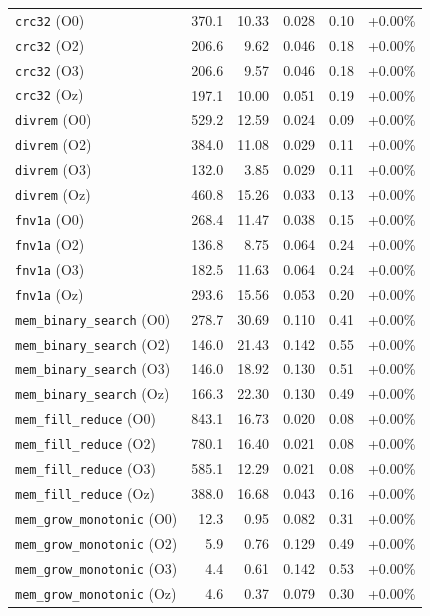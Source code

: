 {\begin{longtable}{lrrrrr}
\texttt{crc32} (O0) & 370.1 & 10.33 & 0.028 & 0.10 & +0.00\% \\
\texttt{crc32} (O2) & 206.6 & 9.62 & 0.046 & 0.18 & +0.00\% \\
\texttt{crc32} (O3) & 206.6 & 9.57 & 0.046 & 0.18 & +0.00\% \\
\texttt{crc32} (Oz) & 197.1 & 10.00 & 0.051 & 0.19 & +0.00\% \\
\texttt{divrem} (O0) & 529.2 & 12.59 & 0.024 & 0.09 & +0.00\% \\
\texttt{divrem} (O2) & 384.0 & 11.08 & 0.029 & 0.11 & +0.00\% \\
\texttt{divrem} (O3) & 132.0 & 3.85 & 0.029 & 0.11 & +0.00\% \\
\texttt{divrem} (Oz) & 460.8 & 15.26 & 0.033 & 0.13 & +0.00\% \\
\texttt{fnv1a} (O0) & 268.4 & 11.47 & 0.038 & 0.15 & +0.00\% \\
\texttt{fnv1a} (O2) & 136.8 & 8.75 & 0.064 & 0.24 & +0.00\% \\
\texttt{fnv1a} (O3) & 182.5 & 11.63 & 0.064 & 0.24 & +0.00\% \\
\texttt{fnv1a} (Oz) & 293.6 & 15.56 & 0.053 & 0.20 & +0.00\% \\
\texttt{mem\_binary\_search} (O0) & 278.7 & 30.69 & 0.110 & 0.41 & +0.00\% \\
\texttt{mem\_binary\_search} (O2) & 146.0 & 21.43 & 0.142 & 0.55 & +0.00\% \\
\texttt{mem\_binary\_search} (O3) & 146.0 & 18.92 & 0.130 & 0.51 & +0.00\% \\
\texttt{mem\_binary\_search} (Oz) & 166.3 & 22.30 & 0.130 & 0.49 & +0.00\% \\
\texttt{mem\_fill\_reduce} (O0) & 843.1 & 16.73 & 0.020 & 0.08 & +0.00\% \\
\texttt{mem\_fill\_reduce} (O2) & 780.1 & 16.40 & 0.021 & 0.08 & +0.00\% \\
\texttt{mem\_fill\_reduce} (O3) & 585.1 & 12.29 & 0.021 & 0.08 & +0.00\% \\
\texttt{mem\_fill\_reduce} (Oz) & 388.0 & 16.68 & 0.043 & 0.16 & +0.00\% \\
\texttt{mem\_grow\_monotonic} (O0) & 12.3 & 0.95 & 0.082 & 0.31 & +0.00\% \\
\texttt{mem\_grow\_monotonic} (O2) & 5.9 & 0.76 & 0.129 & 0.49 & +0.00\% \\
\texttt{mem\_grow\_monotonic} (O3) & 4.4 & 0.61 & 0.142 & 0.53 & +0.00\% \\
\texttt{mem\_grow\_monotonic} (Oz) & 4.6 & 0.37 & 0.079 & 0.30 & +0.00\% \\

\end{longtable}}
